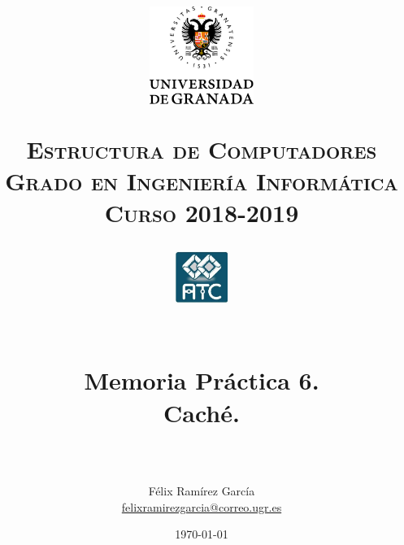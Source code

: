 
\usepackage{url}


\title{	
	\normalfont \normalsize
	\begin{figure}[htb]
		\centering
		\includegraphics[width=0.3\textwidth]{./imagenes/1}
	\end{figure}
	\textsc{\textbf{Estructura de Computadores} \\ Grado en Ingeniería Informática \\ 
	Curso 2018-2019} \\ [25pt] %
	\begin{figure}[htb]
		\centering
		\includegraphics[width=0.15\textwidth]{./imagenes/2}
	\end{figure}
	\horrule{0.5pt} \\[0.4cm] %
	\huge Memoria Práctica 6. \\
	\huge Caché.
	\\ %
	\horrule{2pt} \\[0.5cm] %
}
\author{Félix Ramírez García  \\
\href{mailto:felixramirezgarcia@correo.ugr.es}{felixramirezgarcia@correo.ugr.es}} %
\date{\normalsize\today} %



	
	\maketitle %
	
	\newpage %
	
